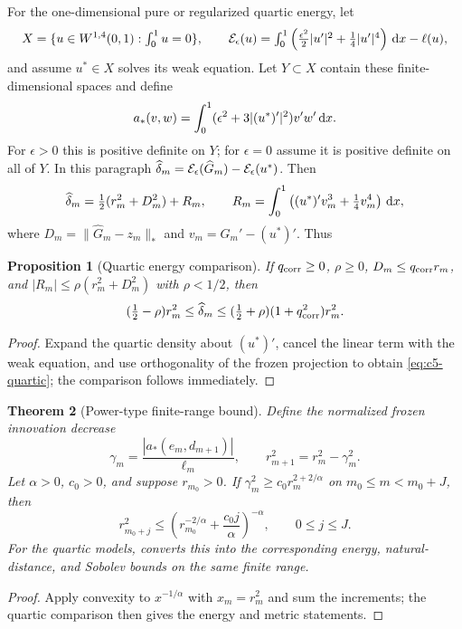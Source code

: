 \documentclass[11pt]{article}
\newtheorem{theorem}{Theorem}[section]
\newtheorem{proposition}[theorem]{Proposition}
\theoremstyle{remark}\newtheorem{remark}[theorem]{Remark}
\begin{document}
For the one-dimensional pure or regularized quartic energy, let
\[
 X=\{u\in W^{1,4}(0,1):\textstyle\int_0^1u=0\},\qquad
 \mathcal E_\epsilon(u)=\int_0^1
 \left(\tfrac{\epsilon^2}{2}|u'|^2+\tfrac14|u'|^4\right)\,\mathrm d x-\ell(u),
\]
and assume $u^*\in X$ solves its weak equation.  Let $Y\subset X$ contain
these finite-dimensional spaces and define
\[
 a_*(v,w)=\int_0^1(\epsilon^2+3|(u^*)'|^2)v'w'\,\mathrm d x.
\]
For $\epsilon>0$ this is positive definite on $Y$; for $\epsilon=0$ assume
it is positive definite on all of $Y$.  In this paragraph
$\widehat\delta_m=\mathcal E_\epsilon(\widehat G_m)-\mathcal E_\epsilon(u^*)$.  Then
\begin{equation}
 \widehat\delta_m=\tfrac12(r_m^2+D_m^2)+R_m,
 \qquad
 R_m=\int_0^1\left((u^*)'v_m^3+\tfrac14v_m^4\right)\,\mathrm d x,
 \label{eq:c5-quartic}
\end{equation}
where $D_m=\|\widehat G_m-z_m\|_*$ and $v_m=\widehat G_m'-(u^*)'$.  Thus
\begin{proposition}[Quartic energy comparison]
\label{prop:c5-quartic}
If $q_{\rm corr}\ge0$, $\rho\ge0$, $D_m\le q_{\rm corr}r_m$, and
$|R_m|\le\rho(r_m^2+D_m^2)$ with $\rho<1/2$, then
\begin{equation}
 (\tfrac12-\rho)r_m^2\le\widehat\delta_m\le
 (\tfrac12+\rho)(1+q_{\rm corr}^2)r_m^2.
 \label{eq:c5-quartic-comparison}
\end{equation}
\end{proposition}
\begin{proof}
Expand the quartic density about $(u^*)'$, cancel the linear term with the weak equation, and use orthogonality of the frozen projection to obtain \eqref{eq:c5-quartic}; the comparison follows immediately.
\end{proof}

\begin{theorem}[Power-type finite-range bound]
\label{thm:c5-power}
Define the normalized frozen innovation decrease
\[
 \gamma_m=\frac{|a_*(e_m,d_{m+1})|}{\ell_m},\qquad
 r_{m+1}^2=r_m^2-\gamma_m^2.
\]
Let $\alpha>0$, $c_0>0$, and suppose $r_{m_0}>0$.  If
$\gamma_m^2\ge c_0r_m^{2+2/\alpha}$ on
$m_0\le m<m_0+J$, then
\begin{equation}
 r_{m_0+j}^2\le\left(r_{m_0}^{-2/\alpha}+\frac{c_0j}{\alpha}\right)^{-\alpha},
 \qquad 0\le j\le J.
 \label{eq:c5-power}
\end{equation}
For the quartic models,  converts this into the corresponding energy, natural-distance, and Sobolev bounds on the same finite range.
\end{theorem}
\begin{proof}
Apply convexity to $x^{-1/\alpha}$ with $x_m=r_m^2$ and sum the increments; the quartic comparison then gives the energy and metric statements.
\end{proof}

\ifdefined\CGAChapterFiveEmbedded
\else
\end{document}
